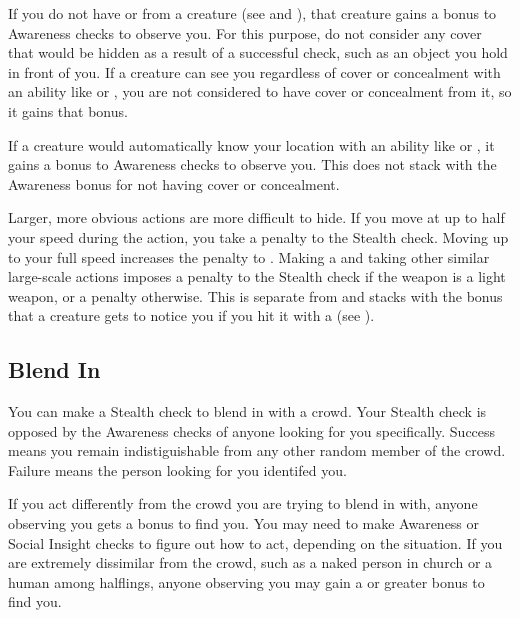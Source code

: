         If you do not have  or  from a creature (see  and ), that creature gains a  bonus to Awareness checks to observe you.
        For this purpose, do not consider any cover that would be hidden as a result of a successful check, such as an object you hold in front of you.
        If a creature can see you regardless of cover or concealment with an ability like  or , you are not considered to have cover or concealment from it, so it gains that  bonus.

        If a creature would automatically know your location with an ability like  or , it gains a  bonus to Awareness checks to observe you.
        This does not stack with the Awareness bonus for not having cover or concealment.

        Larger, more obvious actions are more difficult to hide.
        If you move at up to half your speed during the action, you take a  penalty to the Stealth check.
        Moving up to your full speed increases the penalty to .
        Making a  and taking other similar large-scale actions imposes a  penalty to the Stealth check if the weapon is a light weapon, or a  penalty otherwise.
        This is separate from and stacks with the  bonus that a creature gets to notice you if you hit it with a  (see ).

    \subsection{Blend In}
        You can make a Stealth check to blend in with a crowd. Your Stealth check is opposed by the Awareness checks of anyone looking for you specifically. Success means you remain indistiguishable from any other random member of the crowd. Failure means the person looking for you identifed you.

        If you act differently from the crowd you are trying to blend in with, anyone observing you gets a  bonus to find you. You may need to make Awareness or Social Insight checks to figure out how to act, depending on the situation. If you are extremely dissimilar from the crowd, such as a naked person in church or a human among halflings, anyone observing you may gain a  or greater bonus to find you.

